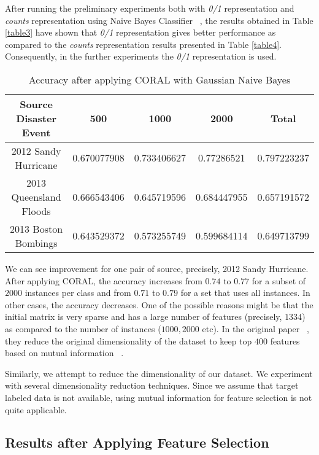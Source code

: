 After running the preliminary experiments both with \textit{0/1} representation and \textit{counts} representation using Naive Bayes Classifier ~\citep{tom}, the results obtained in Table \ref{table3} have shown that \textit{0/1} representation gives better performance as compared to the \textit{counts} representation results presented in Table \ref{table4}. Consequently, in the further experiments the \textit{0/1} representation is used.


\begin{table}[ht]
    \begin{center}
    \caption{Accuracy after applying CORAL with Gaussian Naive Bayes}
    \begin{tabular}[c]{|c|c|c|c|c|}
        \hline
        Source Disaster Event & 500 & 1000 & 2000 & Total \\
        \hline
        2012 Sandy Hurricane & 0.670077908 & 0.733406627 & 0.77286521 & 0.797223237 \\
        2013 Queensland Floods & 0.666543406 & 0.645719596 & 0.684447955 & 0.657191572\\
        2013 Boston Bombings & 0.643529372 & 0.573255749 & 0.599684114 & 0.649713799 \\
        \hline
    \end{tabular}
    \label{tablecoral}
   \end{center}
\end{table}

We can see improvement for one pair of source, precisely, 2012 Sandy Hurricane. After applying CORAL, the accuracy increases from $0.74$ to $0.77$ for a subset of $2000$ instances per class and from $0.71$ to $0.79$ for a set that uses all instances. In other cases, the accuracy decreases. One of the possible reasons might be that the initial matrix is very sparse and has a large number of features (precisely, $1334$) as compared to the number of instances ($1000, 2000$ etc). In the original paper ~\citep{coral}, they reduce the original dimensionality of the dataset to keep top $400$ features based on mutual information ~\citep{hastie}. 

Similarly, we attempt to reduce the dimensionality of our dataset. We experiment with several dimensionality reduction techniques. Since we assume that target labeled data is not available, using mutual information for feature selection is not quite applicable.

\subsection{Results after Applying Feature Selection}
\label{varthressub}

